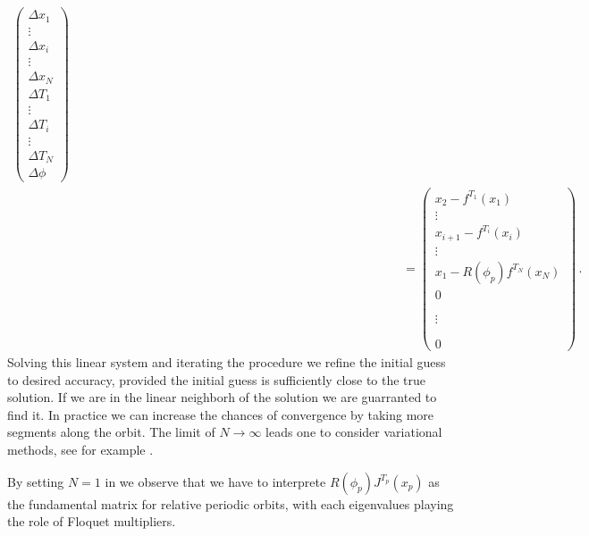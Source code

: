 \begin{eqnarray*}
{     \left(\begin{array}{c}
        \Delta x_1 \\
	\vdots\\
	\Delta x_i \\
	\vdots\\
	\Delta x_N \\
        \Delta T_1 \\
	\vdots	\\
	\Delta T_i \\
	\vdots	\\
	\Delta T_N \\	
	\Delta \phi
     \end{array}\right)}\\%
     & & 
     \hspace{300pt}=\left(\begin{array}{c}
	x_2-f^{T_1}(x_1)\\
	\vdots\\	
        x_{i+1}-f^{T_i}(x_i) \\
	\vdots\\
	x_{1}-R(\phi_p)f^{T_N}(x_N)\\
       	0    \\
	\\
	\\
	\vdots\\
	\\
	\\
	0
     \end{array}\right)\,.
     \label{eq:NewtonScheme}
\end{eqnarray*}
\normalsize
Solving this linear system and iterating the procedure we refine the initial guess to desired accuracy,
provided the initial guess is sufficiently close to the true solution. If we are in the linear neighborh
of the solution we are guarranted to find it. In practice we can increase the chances of convergence 
by taking more segments along the orbit. The limit of $N\rightarrow\infty$ leads one to consider
variational methods, see for example .

By setting $N=1$ in  we observe that we have to interprete $R(\phi_p)J^{T_p}(x_p)$
as the fundamental matrix for relative periodic orbits, with each eigenvalues playing the role
of Floquet multipliers.

